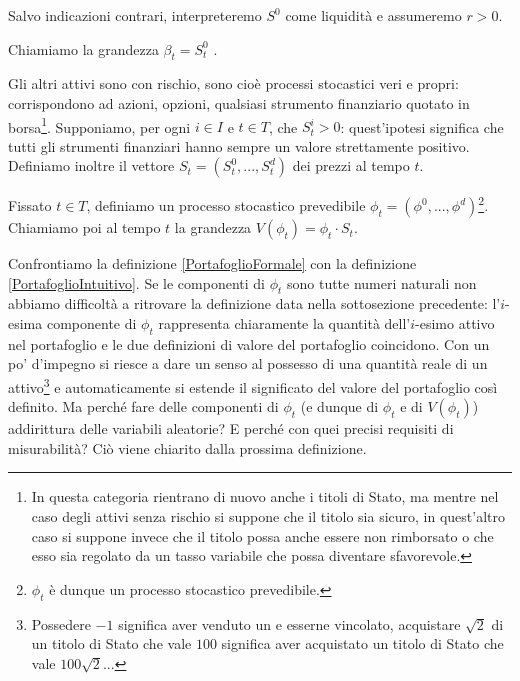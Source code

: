 \par Salvo indicazioni contrari, interpreteremo $S^0$ come liquidit\`a e assumeremo $r > 0$.
\begin{Definition}
	Chiamiamo la grandezza $\beta_t = S^0_t$ .
\end{Definition}
\par Gli altri attivi sono con rischio, sono cio\`e processi stocastici veri e propri: corrispondono ad azioni, opzioni, qualsiasi strumento finanziario quotato in borsa\footnote{In questa categoria rientrano di nuovo anche i titoli di Stato, ma mentre nel caso degli attivi senza rischio si suppone che il titolo sia sicuro, in quest'altro caso si suppone invece che il titolo possa anche essere non rimborsato o che esso sia regolato da un tasso variabile che possa diventare sfavorevole.}. Supponiamo, per ogni $i \in I$ e $t \in T$, che $S^i_t > 0$: quest'ipotesi significa che tutti gli strumenti finanziari hanno sempre un valore strettamente positivo. Definiamo inoltre il vettore $S_t = (S^0_t, ..., S^d_t)$ dei prezzi al tempo $t$.
\begin{Definition}\label{PortafoglioFormale}
	Fissato $t \in T$, definiamo  un processo stocastico prevedibile $\phi_t = (\phi^0,...,\phi^d)$\footnote{$\phi_t$ \`e dunque un processo stocastico prevedibile.}. Chiamiamo poi  al tempo $t$ la grandezza $V(\phi_t) = \phi_t \cdot S_t$.
\end{Definition}
\par Confrontiamo la definizione \ref{PortafoglioFormale} con la definizione \ref{PortafoglioIntuitivo}. Se le componenti di $\phi_t$ sono tutte numeri naturali non abbiamo difficolt\`a a ritrovare la definizione data nella sottosezione precedente: l'$i$-esima componente di $\phi_t$ rappresenta chiaramente la quantit\`a dell'$i$-esimo attivo nel portafoglio e le due definizioni di valore del portafoglio coincidono. Con un po' d'impegno si riesce a dare un senso al possesso di una quantit\`a reale di un attivo\footnote{Possedere $-1$ \Put significa aver venduto un \Put e esserne vincolato, acquistare $\sqrt{2}$ di un titolo di Stato che vale $100$ significa aver acquistato un titolo di Stato che vale $100\sqrt{2}$...} e automaticamente si estende il significato del valore del portafoglio cos\`i definito. Ma perch\'e fare delle componenti di $\phi_t$ (e dunque di $\phi_t$ e di $V(\phi_t)$) addirittura delle variabili aleatorie? E perch\'e con quei precisi requisiti di misurabilit\`a? Ci\`o viene chiarito dalla prossima definizione.
